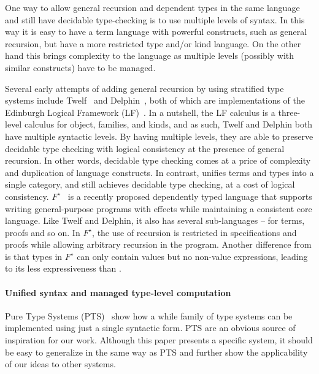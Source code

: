 One way to allow general recursion and dependent types in the same
language and still have decidable type-checking is to use multiple
levels of syntax. In this way it is easy to have a term language with
powerful constructs, such as general recursion, but have a more
restricted type and/or kind language. On the other hand this brings
complexity to the language as multiple levels (possibly with similar
constructs) have to be managed.

Several early attempts of adding general recursion by using stratified
type systems include Twelf~\cite{lf:twelf} and
Delphin~\cite{lf:delphin}, both of which are implementations of the
Edinburgh Logical Framework (LF)~\cite{harper:lf}. In a nutshell, the
LF calculus is a three-level calculus for object, families, and kinds,
and as such, Twelf and Delphin both have multiple syntactic levels. By
having multiple levels, they are able to preserve decidable type
checking with logical consistency at the presence of general
recursion. In other words, decidable type checking comes at a price of
complexity and duplication of language constructs. In contrast, \name
unifies terms and types into a single category, and still achieves
decidable type checking, at a cost of logical
consistency. $F^{\star}$~\cite{Swamy2011} is a recently proposed
dependently typed language that supports writing general-purpose
programs with effects while maintaining a consistent core
language. Like Twelf and Delphin, it also has several sub-languages --
for terms, proofs and so on. In $F^{\star}$, the use of recursion is
restricted in specifications and proofs while allowing arbitrary
recursion in the program. Another difference from \name is that types
in $F^{\star}$ can only contain values but no non-value expressions,
leading to its less expressiveness than \name.

\paragraph{Unified syntax and managed type-level computation}

Pure Type Systems (PTS)~\cite{pts} show how a while family of type
systems can be implemented using just a single syntactic form. PTS are
an obvious source of inspiration for our work. Although this paper
presents a specific system, it should be easy to generalize \name in
the same way as PTS and further show the applicability of our ideas to
other systems.

